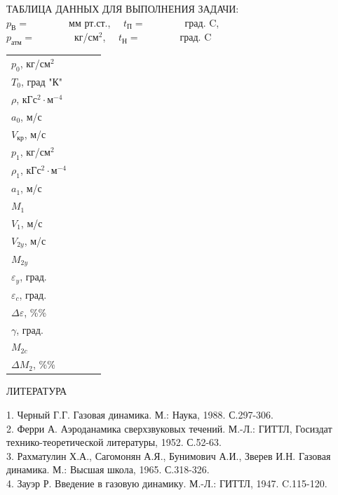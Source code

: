 \documentclass[specialist, subf, href, colorlinks=true, 14pt, final]{disser}
\theoremstyle{definition}
\begin{document}
\begin{center}
ТАБЛИЦА ДАННЫХ ДЛЯ ВЫПОЛНЕНИЯ ЗАДАЧИ:\\
$p_{\text{В}} = $\ \ \ \ \ \ \ \ мм рт.ст., \ \ 
$t_{\text{П}} = $\ \ \ \ \ \ \ \ град. C,\\
$p_{\text{атм}} = $\ \ \ \ \ \ \ \ кг/см$^2$, \ \ 
$t_{\text{Н}} = $\ \ \ \ \ \ \ \ град. C\\

\vspace{0.5cm}
\begin{tabular}{|l|p{4cm}|p{4cm}|p{4cm}|}
\hline
 & \makecell{$\delta = 5^o$} & \makecell{$\delta = 10^o$} & \makecell{$\delta = 15^o$}\\
\hline
 $p_0$, кг/см$^2$ & & &\\
\hline
 $T_0$, град "К" & & &\\
\hline
 $\rho$, кГс$^2\cdot$м$^{-4}$ & & &\\
\hline
 $a_0$, м/с & & &\\
\hline
 $V_{\text{кр}}$, м/с & & &\\
\hline
 $p_1$, кг/см$^2$ & & &\\
\hline
 $\rho_1$, кГс$^2\cdot$м$^{-4}$ & & &\\
\hline
 $a_1$, м/с & & &\\ 
\hline
 $M_1$ & & &\\
\hline
 $V_{1}$, м/с & & &\\ 
\hline
 $V_{2y}$, м/с & & &\\
\hline
 $M_{2y}$ & & &\\
\hline
 $\varepsilon_{y}$, град. & & &\\
\hline
 $\varepsilon_{c}$, град. & & &\\
\hline
 $\Delta\varepsilon$, \%\% & & &\\
\hline
 $\gamma$, град. & & &\\
\hline
 $M_{2c}$ & & &\\
\hline
 $\Delta M_{2}$, \%\% & & &\\
\hline
\end{tabular}
\end{center}
\newpage
\begin{center}
ЛИТЕРАТУРА
\end{center}
1. Черный Г.Г. Газовая динамика. М.: Наука, 1988. С.297-306.\\
2. Ферри А. Аэроданамика сверхзвуковых течений. М.-Л.: ГИТТЛ,
Госиздат технико-теоретической литературы, 1952. С.52-63.\\
3. Рахматулин Х.А., Сагомонян А.Я., Бунимович А.И., Зверев И.Н.
Газовая динамика. М.: Высшая школа, 1965. С.318-326.\\
4. Зауэр Р. Введение в газовую динамику. М.-Л.: ГИТТЛ, 1947.
C.115-120.
\end{document}
